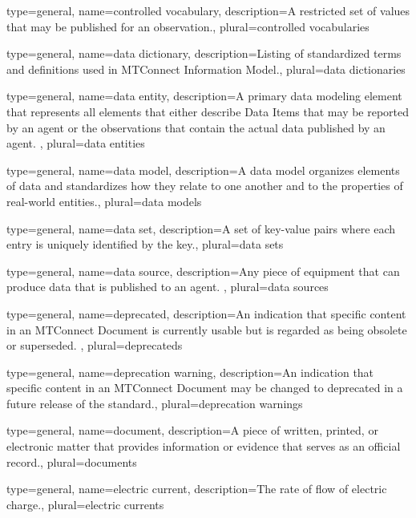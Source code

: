 {
	type={general},
    name={controlled vocabulary},
	description={A restricted set of values that may be published for an \gls{observation}.},
	plural={controlled vocabularies}
}

{
	type={general},
    name={data dictionary},
	description={Listing of standardized terms and definitions used in \gls{MTConnect Information Model}.},
	plural={data dictionaries}
}

{
	type={general},
    name={data entity},
	description={A primary data modeling element that represents all elements that either describe \glspl{Data Item} that may be reported by an \gls{agent} or the \glspl{observation} that contain the actual data published by an \gls{agent}.
},
	plural={data entities}
}

{
	type={general},
    name={data model},
	description={A data model organizes elements of data and standardizes how they relate to one another and to the properties of real-world entities.},
	plural={data models}
}

{
	type={general},
    name={data set},
	description={A set of \glspl{key-value pair} where each entry is uniquely identified by the \gls{key}.},
	plural={data sets}
}

{
	type={general},
    name={data source},
	description={Any piece of equipment that can produce data that is published to an \gls{agent}.
},
	plural={data sources}
}

{
	type={general},
    name={deprecated},
	description={An indication that specific content in an \gls{MTConnect Document} is currently usable but is regarded as being obsolete or superseded. },
	plural={deprecateds}
}

{
	type={general},
    name={deprecation warning},
	description={An indication that specific content in an \gls{MTConnect Document} may be changed to \gls{deprecated} in a future release of the standard.},
	plural={deprecation warnings}
}

{
	type={general},
    name={document},
	description={A piece of written, printed, or electronic matter that provides information or evidence that serves as an official record.},
	plural={documents}
}

{
	type={general},
    name={electric current},
	description={The rate of flow of electric charge.},
	plural={electric currents}
}

